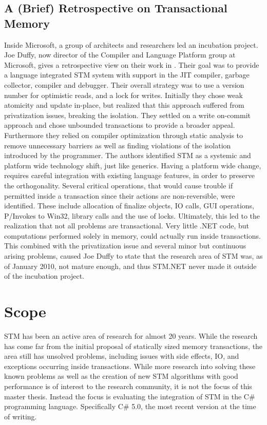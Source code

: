 \subsection{A (Brief) Retrospective on Transactional Memory}
Inside Microsoft, a group of architects and researchers led an incubation project. Joe Duffy, now director of the Compiler and Language Platform group at Microsoft, gives a retrospective view on their work in \cite{duffy2010stmnet}. Their goal was to provide a language integrated \ac{STM} system with support in the \ac{JIT} compiler, garbage collector, compiler and debugger. Their overall strategy was to use a version number for optimistic reads, and a lock for writes. Initially they chose weak atomicity and update in-place, but realized that this approach suffered from privatization issues, breaking the isolation. They settled on a write on-commit approach and chose unbounded transactions to provide a broader appeal. Furthermore they relied on compiler optimization through static analysis to remove unnecessary barriers as well as finding violations of the isolation introduced by the programmer. The authors identified \ac{STM} as a systemic and platform wide technology shift, just like generics. Having a platform wide change, requires careful integration with existing language features, in order to preserve the orthogonality. Several critical operations, that would cause trouble if permitted inside a transaction since their actions are non-reversible, were identified. These include allocation of finalize objects, \ac{IO} calls, GUI operations, P/Invokes to Win32, library calls and the use of locks. Ultimately, this led to the realization that not all problems are transactional. Very little .NET code, but computations performed solely in memory, could actually run inside transactions. This combined with the privatization issue and several minor but continuous arising problems, caused Joe Duffy to state that the research area of \ac{STM} was, as of January 2010, not mature enough, and thus STM.NET never made it outside of the incubation project.

\section{Scope}\label{sec:scope}
\ac{STM} has been an active area of research for almost 20 years\cite{shavit1997software}. While the research has come far from the initial proposal of statically sized memory transactions, the area still has unsolved problems, including issues with side effects, \ac{IO}, and exceptions occurring inside transactions\cite{harris2005exceptions}. While more research into solving these known problems as well as the creation of new \ac{STM} algorithms with good performance is of interest to the research community, it is not the focus of this master thesis. Instead the focus is evaluating the integration of \ac{STM} in the C\# programming language. Specifically C\# 5.0, the most recent version at the time of writing\cite{csharp2013specificaiton}.

